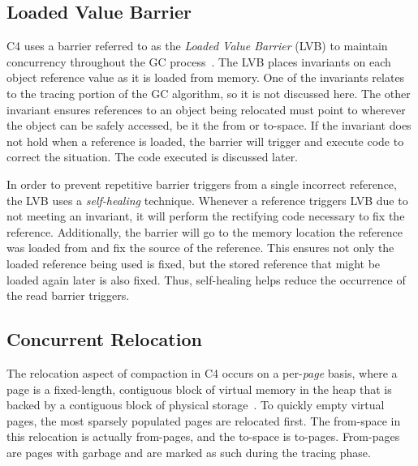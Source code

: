 \documentclass{sig-alternate}
\begin{document}
\subsection{Loaded Value Barrier}
\label{sec:c4LVB}

C4 uses a barrier referred to as the \emph{Loaded Value Barrier} (LVB) to 
maintain concurrency throughout the GC process~\cite{Tene:C4}. The LVB 
places invariants on each object reference value as it is loaded from memory.
One of the invariants relates to the tracing portion of the GC algorithm, so
it is not discussed here. The other invariant ensures
references to an object being relocated must point 
to wherever the object can be safely accessed, be it the from or to-space.
If the invariant does not hold
when a reference is loaded, the barrier will trigger and execute code to correct
the situation. The code executed is discussed later.

In order to prevent repetitive barrier triggers from a single incorrect reference,
the LVB uses a \emph{self-healing} technique. Whenever a reference triggers LVB
due to not meeting an invariant, it will perform the rectifying code
necessary to fix the reference. Additionally, the barrier will go to the memory
location the reference was loaded from and fix the source of the reference. This
ensures not only the loaded reference being used is fixed, but the stored reference
that might be loaded again later is also fixed.
Thus, self-healing helps reduce the occurrence of the read barrier triggers.


\subsection{Concurrent Relocation}
\label{sec:c4Relocation}

The relocation aspect of compaction in C4 occurs on a per-\emph{page}
basis, where a page is a fixed-length, contiguous block of virtual memory in the heap
that is backed by a contiguous block of physical storage~\cite{Tene:C4}.
To quickly empty virtual pages, the most sparsely populated pages are relocated
first. The from-space in this relocation is actually from-pages, and the to-space
is to-pages. From-pages are pages with garbage
and are marked as such during the tracing phase.
\end{document}
